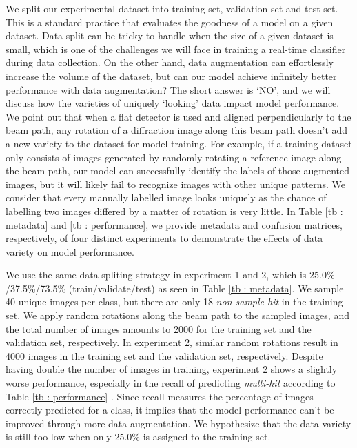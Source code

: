 We split our experimental dataset into training set, validation set and test
set.  This is a standard practice that evaluates the goodness of a model on a
given dataset.  Data split can be tricky to handle when the size of a given
dataset is small, which is one of the challenges we will face in training a
real-time classifier during data collection.  On the other hand, data
augmentation can effortlessly increase the volume of the dataset, but can our
model achieve infinitely better performance with data augmentation?  The short
answer is `NO', and we will discuss how the varieties of uniquely `looking' data
impact model performance.  We point out that when a flat detector is used and
aligned perpendicularly to the beam path, any rotation of a diffraction image
along this beam path doesn't add a new variety to the dataset for model
training.  For example, if a training dataset only consists of images generated
by randomly rotating a reference image along the beam path, our model can
successfully identify the labels of those augmented images, but it will likely
fail to recognize images with other unique patterns.  We consider that every
manually labelled image looks uniquely as the chance of labelling two images
differed by a matter of rotation is very little.  In Table \ref{tb : metadata}
and \ref{tb : performance}, we provide metadata and confusion matrices,
respectively, of four distinct experiments to demonstrate the effects of data
variety on model performance.  

We use the same data spliting strategy in experiment 1 and 2, which is 25.0\%
/37.5\%/73.5\% (train/validate/test) as seen in Table \ref{tb : metadata}.  We
sample 40 unique images per class, but there are only 18 \textit{non-sample-hit}
in the training set.  We apply random rotations along the beam path to the
sampled images, and the total number of images amounts to 2000 for the training
set and the validation set, respectively.  In experiment 2, similar random
rotations result in 4000 images in the training set and the validation set,
respectively.  Despite having double the number of images in training,
experiment 2 shows a slightly worse performance, especially in the recall of
predicting \textit{multi-hit} according to Table \ref{tb : performance} .  Since
recall measures the percentage of images correctly predicted for a class, it
implies that the model performance can't be improved through more data
augmentation.  We hypothesize that the data variety is still too low when only
25.0\% is assigned to the training set.  

